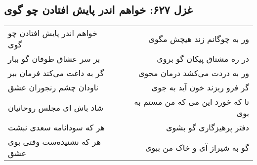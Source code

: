 \begin{center}
\section*{غزل ۶۲۷: خواهم اندر پایش افتادن چو گوی}
\label{sec:627}
\begin{longtable}{l p{0.5cm} r}
خواهم اندر پایش افتادن چو گوی
&&
ور به چوگانم زند هیچش مگوی
\\
بر سر عشاق طوفان گو ببار
&&
در ره مشتاق پیکان گو بروی
\\
گر به داغت می‌کند فرمان ببر
&&
ور به دردت می‌کشد درمان مجوی
\\
ناودان چشم رنجوران عشق
&&
گر فرو ریزند خون آید به جوی
\\
شاد باش ای مجلس روحانیان
&&
تا که خورد این می که من مستم به بوی
\\
هر که سودانامه سعدی نبشت
&&
دفتر پرهیزگاری گو بشوی
\\
هر که نشنیده‌ست وقتی بوی عشق
&&
گو به شیراز آی و خاک من ببوی
\\
\end{longtable}
\end{center}
